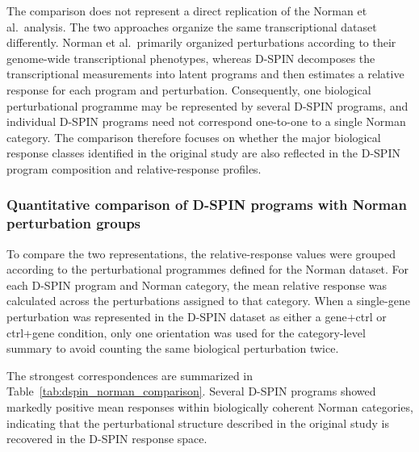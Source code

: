 \documentclass[11pt,a4paper]{article}
\begin{document}
The comparison does not represent a direct replication of the Norman et al.~analysis. The two approaches organize the same transcriptional dataset differently. Norman et al.~primarily organized perturbations according to their genome-wide transcriptional phenotypes, whereas D-SPIN decomposes the transcriptional measurements into latent programs and then estimates a relative response for each program and perturbation. Consequently, one biological perturbational programme may be represented by several D-SPIN programs, and individual D-SPIN programs need not correspond one-to-one to a single Norman category. The comparison therefore focuses on whether the major biological response classes identified in the original study are also reflected in the D-SPIN program composition and relative-response profiles.

\subsubsection{Quantitative comparison of D-SPIN programs with Norman perturbation groups}

To compare the two representations, the relative-response values were grouped according to the perturbational programmes defined for the Norman dataset. For each D-SPIN program and Norman category, the mean relative response was calculated across the perturbations assigned to that category. When a single-gene perturbation was represented in the D-SPIN dataset as either a gene+ctrl or ctrl+gene condition, only one orientation was used for the category-level summary to avoid counting the same biological perturbation twice.

The strongest correspondences are summarized in Table~\ref{tab:dspin_norman_comparison}. Several D-SPIN programs showed markedly positive mean responses within biologically coherent Norman categories, indicating that the perturbational structure described in the original study is recovered in the D-SPIN response space.
\end{document}
